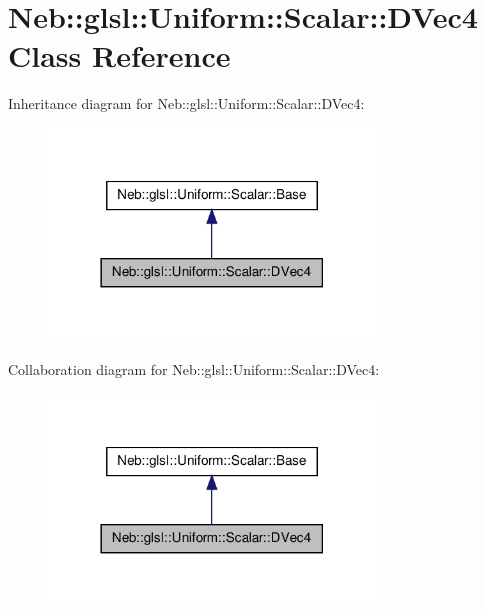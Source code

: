 \hypertarget{classNeb_1_1glsl_1_1Uniform_1_1Scalar_1_1DVec4}{\section{\-Neb\-:\-:glsl\-:\-:\-Uniform\-:\-:\-Scalar\-:\-:\-D\-Vec4 \-Class \-Reference}
\label{classNeb_1_1glsl_1_1Uniform_1_1Scalar_1_1DVec4}
}


\-Inheritance diagram for \-Neb\-:\-:glsl\-:\-:\-Uniform\-:\-:\-Scalar\-:\-:\-D\-Vec4\-:\nopagebreak
\begin{figure}[H]
\begin{center}
\leavevmode
\includegraphics[width=246pt]{classNeb_1_1glsl_1_1Uniform_1_1Scalar_1_1DVec4__inherit__graph}
\end{center}
\end{figure}


\-Collaboration diagram for \-Neb\-:\-:glsl\-:\-:\-Uniform\-:\-:\-Scalar\-:\-:\-D\-Vec4\-:\nopagebreak
\begin{figure}[H]
\begin{center}
\leavevmode
\includegraphics[width=246pt]{classNeb_1_1glsl_1_1Uniform_1_1Scalar_1_1DVec4__coll__graph}
\end{center}
\end{figure}
